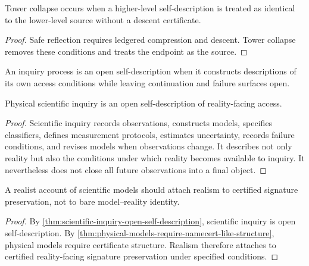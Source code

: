 \begin{corollary}
\label{cor:tower-collapse-unsafe-reflection}
Tower collapse occurs when a higher-level self-description is treated as identical to the lower-level source without a descent certificate.
\end{corollary}

\begin{proof}
Safe reflection requires ledgered compression and descent. Tower collapse removes these conditions and treats the endpoint as the source.
\end{proof}

\begin{definition}
\label{def:open-self-description}
An inquiry process is an open self-description when it constructs descriptions of its own access conditions while leaving continuation and failure surfaces open.
\end{definition}

\begin{theorem}
\label{thm:scientific-inquiry-open-self-description}
Physical scientific inquiry is an open self-description of reality-facing access.
\end{theorem}

\begin{proof}
Scientific inquiry records observations, constructs models, specifies classifiers, defines measurement protocols, estimates uncertainty, records failure conditions, and revises models when observations change. It describes not only reality but also the conditions under which reality becomes available to inquiry. It nevertheless does not close all future observations into a final object.
\end{proof}

\begin{corollary}
\label{cor:scientific-realism-certificate-realism}
A realist account of scientific models should attach realism to certified signature preservation, not to bare model--reality identity.
\end{corollary}

\begin{proof}
By \autoref{thm:scientific-inquiry-open-self-description}, scientific inquiry is open self-description. By \autoref{thm:physical-models-require-namecert-like-structure}, physical models require certificate structure. Realism therefore attaches to certified reality-facing signature preservation under specified conditions.
\end{proof}

